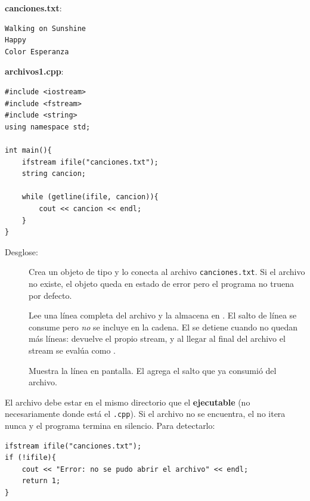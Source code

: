 \documentclass[12pt, oneside]{article}
\begin{document}
\textbf{canciones.txt}:
\begin{verbatim}
Walking on Sunshine
Happy
Color Esperanza
\end{verbatim}

\textbf{archivos1.cpp}:
\begin{verbatim}
#include <iostream>
#include <fstream>
#include <string>
using namespace std;

int main(){
    ifstream ifile("canciones.txt");
    string cancion;

    while (getline(ifile, cancion)){
        cout << cancion << endl;
    }
}
\end{verbatim}

Desglose:

\begin{description}
  \item[]
    Crea un objeto de tipo \textbf{} y lo conecta al archivo
    \texttt{canciones.txt}.  Si el archivo no existe, el objeto queda en
    estado de error pero el programa no truena por defecto.

  \item[]
    Lee una línea completa del archivo y la almacena en .
    El salto de línea se consume pero \textit{no} se incluye en la cadena.
    El  se detiene cuando no quedan más líneas: 
    devuelve el propio stream, y al llegar al final del archivo el stream
    se evalúa como .

  \item[]
    Muestra la línea en pantalla.  El  agrega el salto que
     ya consumió del archivo.
\end{description}

\begin{advertencia}
  El archivo debe estar en el mismo directorio que el \textbf{ejecutable}
  (no necesariamente donde está el \texttt{.cpp}).  Si el archivo no se
  encuentra, el  no itera nunca y el programa termina en
  silencio.  Para detectarlo:
  \begin{verbatim}
ifstream ifile("canciones.txt");
if (!ifile){
    cout << "Error: no se pudo abrir el archivo" << endl;
    return 1;
}
  \end{verbatim}
\end{advertencia}

\end{document}
